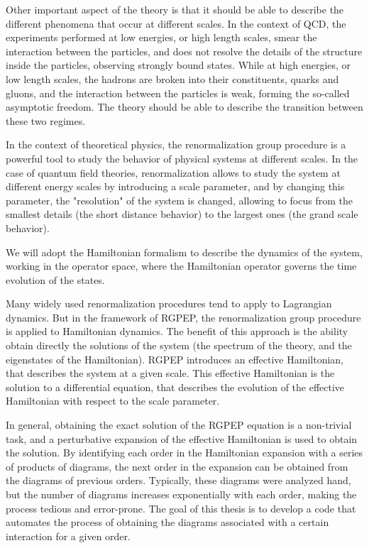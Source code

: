 \documentclass[11pt,a4paper,twoside,pdf]{article}
\numberwithin{equation}{section}
\begin{document}
Other important aspect of the theory is that it should be able to describe the 
different phenomena that occur at different scales. In the context of QCD, the 
experiments performed at low energies, or high length scales, smear the interaction
between the particles, and does not resolve the details of the structure inside the
particles, observing strongly bound states. While at high energies, or low length 
scales, the hadrons are broken into their constituents, quarks and gluons, and the 
interaction between the particles is weak, forming the so-called asymptotic freedom.
The theory should be able to describe the transition between these two regimes.

In the context of theoretical physics, the renormalization group procedure is a 
powerful tool to study the behavior of physical systems at different scales. In
the case of quantum field theories, renormalization allows to study the system
at different energy scales by introducing a scale parameter, and by changing 
this parameter, the "resolution" of the system is changed, allowing to focus from 
the smallest details (the short distance behavior) to the largest ones (the grand 
scale behavior). 

We will adopt the Hamiltonian formalism to describe the dynamics of the system, 
working in the operator space, where the Hamiltonian operator governs the time
evolution of the states. 

Many widely used renormalization procedures tend to apply to Lagrangian dynamics. But 
in the framework of RGPEP, the renormalization group procedure is applied to 
Hamiltonian dynamics. The benefit of this approach is the ability obtain directly 
the solutions of the system (the spectrum of the theory, and the eigenstates of the 
Hamiltonian). RGPEP introduces an effective Hamiltonian, that describes the system at a
given scale. This effective Hamiltonian is the solution to a differential equation,
that describes the evolution of the effective Hamiltonian with respect to the
scale parameter.

In general, obtaining the exact solution of the RGPEP equation is a non-trivial task, 
and a perturbative expansion of the effective Hamiltonian is used to obtain the 
solution. By identifying each order in the Hamiltonian expansion with a series of 
products of diagrams, the next order in the expansion can be obtained from the 
diagrams of previous orders. Typically, these diagrams were analyzed hand, but the 
number of diagrams increases exponentially with each order, making the process 
tedious and error-prone. The goal of this thesis is to develop a code that automates 
the process of obtaining the diagrams associated with a certain interaction for a 
given order.
\end{document}

